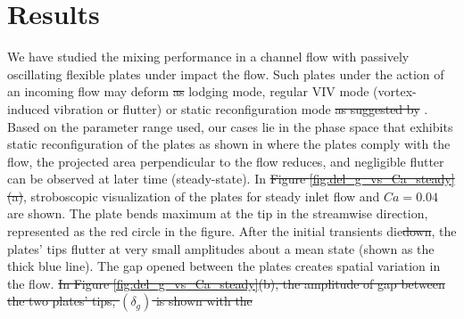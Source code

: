 \documentclass[%
aip,
amsmath,amssymb,
reprint,
]{revtex4-1}
\providecommand{\DIFadd}[1]{{\protect\color{blue}\uwave{#1}}} %
\providecommand{\DIFdel}[1]{{\protect\color{red}\sout{#1}}}                      %
\providecommand{\DIFaddbegin}{} %
\providecommand{\DIFaddend}{} %
\providecommand{\DIFdelbegin}{} %
\providecommand{\DIFdelend}{} %
\newcommand{\DIFscaledelfig}{0.5}
\newlength{\DIFdelgraphicswidth} %
\newlength{\DIFdelgraphicsheight} %
\newcommand{\DIFaddincludegraphics}[2][]{{\color{blue}\fbox{\DIFOincludegraphics[#1]{#2}}}} %
\newcommand{\DIFdelincludegraphics}[2][]{%
\sbox{\DIFdelgraphicsbox}{\DIFOincludegraphics[#1]{#2}}%
\settoboxwidth{\DIFdelgraphicswidth}{\DIFdelgraphicsbox} %
\settoboxtotalheight{\DIFdelgraphicsheight}{\DIFdelgraphicsbox} %
\scalebox{\DIFscaledelfig}{%
\parbox[b]{\DIFdelgraphicswidth}{\usebox{\DIFdelgraphicsbox}\\[-\baselineskip] \rule{\DIFdelgraphicswidth}{0em}}\llap{\resizebox{\DIFdelgraphicswidth}{\DIFdelgraphicsheight}{%
\setlength{\unitlength}{\DIFdelgraphicswidth}%
\begin{picture}(1,1)%
\thicklines\linethickness{2pt} %
{\color[rgb]{1,0,0}\put(0,0){\framebox(1,1){}}}%
{\color[rgb]{1,0,0}\put(0,0){\line( 1,1){1}}}%
{\color[rgb]{1,0,0}\put(0,1){\line(1,-1){1}}}%
\end{picture}%
}\hspace*{3pt}}} %
} %
\DeclareRobustCommand{\DIFaddbegin}{\DIFOaddbegin \let\includegraphics\DIFaddincludegraphics} %
\DeclareRobustCommand{\DIFaddend}{\DIFOaddend \let\includegraphics\DIFOincludegraphics} %
\DeclareRobustCommand{\DIFdelbegin}{\DIFOdelbegin \let\includegraphics\DIFdelincludegraphics} %
\DeclareRobustCommand{\DIFdelend}{\DIFOaddend \let\includegraphics\DIFOincludegraphics} %
\begin{document}
		\DIFaddend 

		
		\section{Results}
		We have studied the mixing performance in a channel flow with passively oscillating flexible plates under impact the flow. Such plates under the action of an incoming flow may deform \DIFdelbegin \DIFdel{as }\DIFdelend \DIFaddbegin \DIFadd{in }\DIFaddend lodging mode, regular VIV mode (vortex-induced vibration or flutter) or static reconfiguration mode \DIFdelbegin \DIFdel{as suggested by }\DIFdelend \cite{Zhang2020}. Based on the parameter range used, our cases lie in the phase space that exhibits static reconfiguration of the plates as shown in \cite{Zhang2020} where the plates comply with the flow, the projected area perpendicular to the flow reduces, and negligible flutter can be observed at \DIFaddbegin \DIFadd{a }\DIFaddend later time (steady-state). In \DIFdelbegin \DIFdel{Figure \ref{fig:del_g_vs_Ca_steady}(a)}\DIFdelend \DIFaddbegin \DIFadd{Fig. \ref{fig:del_g_vs_Ca_steady}$(a)$}\DIFaddend , stroboscopic visualization of the plates for steady inlet flow and $Ca=0.04$ are shown. The plate bends maximum at the tip in the streamwise direction, represented as the red circle in the figure. After the initial transients die\DIFdelbegin \DIFdel{down}\DIFdelend , the plates' tips flutter at very small amplitudes about a mean state (shown as the thick blue line). The gap opened between the plates creates spatial variation in the flow. 
		\DIFdelbegin \DIFdel{In Figure \ref{fig:del_g_vs_Ca_steady}(b), the amplitude of gap between the two plates' tips, $(\delta_g)$ is shown with the }\DIFdelend \DIFaddbegin 
\end{document}
